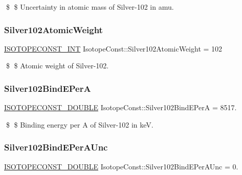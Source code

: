 \$ \$ Uncertainty in atomic mass of Silver-\/102 in amu. \mbox{\label{group___isotope_const-_silver-_ag102_ga01dc23f0bcce9ac08a511f59ba07c1ad}} 
\subsubsection{\texorpdfstring{Silver102\+Atomic\+Weight}{Silver102AtomicWeight}}
{\footnotesize\ttfamily \mbox{\hyperlink{group___isotope_const-_macros_ga5f18360b3e99483a35c32d789e62621c}{I\+S\+O\+T\+O\+P\+E\+C\+O\+N\+S\+T\+\_\+\+I\+NT}} Isotope\+Const\+::\+Silver102\+Atomic\+Weight = 102}

\$ \$ Atomic weight of Silver-\/102. \mbox{\label{group___isotope_const-_silver-_ag102_gafe59e4609c696f508282e662f067dbca}} 
\subsubsection{\texorpdfstring{Silver102\+Bind\+E\+PerA}{Silver102BindEPerA}}
{\footnotesize\ttfamily \mbox{\hyperlink{group___isotope_const-_macros_ga8f45a7272ce02c0b4c65c44636ed719a}{I\+S\+O\+T\+O\+P\+E\+C\+O\+N\+S\+T\+\_\+\+D\+O\+U\+B\+LE}} Isotope\+Const\+::\+Silver102\+Bind\+E\+PerA = 8517.}

\$ \$ Binding energy per A of Silver-\/102 in keV. \mbox{\label{group___isotope_const-_silver-_ag102_ga5024d7015cbec3a52875102b12f7794f}} 
\subsubsection{\texorpdfstring{Silver102\+Bind\+E\+Per\+A\+Unc}{Silver102BindEPerAUnc}}
{\footnotesize\ttfamily \mbox{\hyperlink{group___isotope_const-_macros_ga8f45a7272ce02c0b4c65c44636ed719a}{I\+S\+O\+T\+O\+P\+E\+C\+O\+N\+S\+T\+\_\+\+D\+O\+U\+B\+LE}} Isotope\+Const\+::\+Silver102\+Bind\+E\+Per\+A\+Unc = 0.}

